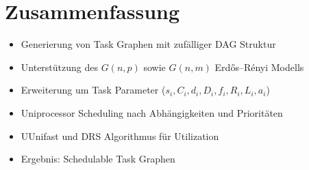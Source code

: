\documentclass{include/sikslides}
\begin{document}
\section{Zusammenfassung}
\begin{frame} {\secname}
	\begin{itemize}
		\item Generierung von Task Graphen mit zufälliger DAG Struktur
		\item Unterstützung des $G(n,p)$ sowie $G(n,m)$ Erdős–Rényi Modells
		\item Erweiterung um Task Parameter ($s_i, C_i, d_i, D_i, f_i, R_i, L_i, a_i$)
		\item Uniprocessor Scheduling nach Abhängigkeiten und Prioritäten
		\item UUnifast und DRS Algorithmus für Utilization
		\item Ergebnis: Schedulable Task Graphen 
	\end{itemize}
\end{frame}
\end{document}
